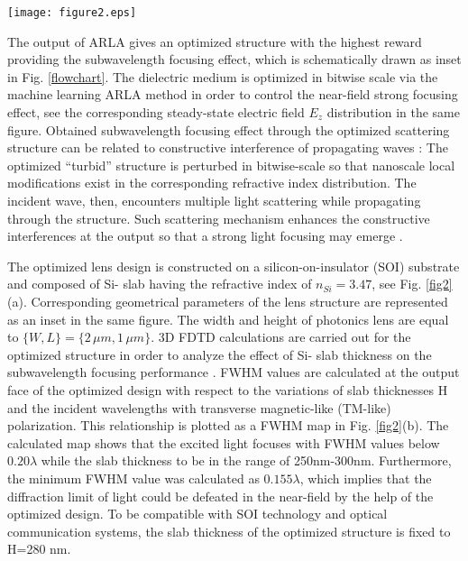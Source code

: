 \documentclass[9pt,twocolumn,twoside]{article}
\begin{document}
  \begin{figure*}[!th]
    \centering
    \texttt{[image: figure2.eps]}
    \caption{(a) Optimized bitwise photonic structure design as a near field sub-wavelength lens. (b) FWHM map depending on the slab thickness and incident wavelength variations. (c) The cross-sections of field intensities are taken at the output and plotted as a map depending on the incident wavelengths.}
    \label{fig2}
  \end{figure*}
  
  The output of ARLA gives an optimized structure with the highest reward providing the subwavelength focusing effect, which is schematically drawn as inset in Fig. \ref{flowchart}. The dielectric medium is optimized in bitwise scale via the machine learning ARLA method in order to control the near-field strong focusing effect, see the corresponding steady-state electric field $E_z$ distribution in the same figure. Obtained subwavelength focusing effect through the optimized scattering structure can be related to constructive interference of propagating waves \cite{Wiersma2013}: The optimized “turbid” structure is perturbed in bitwise-scale so that nanoscale local modifications exist in the corresponding refractive index distribution. The incident wave, then, encounters multiple light scattering while propagating through the structure. Such scattering mechanism enhances the constructive interferences at the output so that a strong light focusing may emerge \cite{Mosk2012}.
  
  The optimized lens design is constructed on a silicon-on-insulator (SOI) substrate and composed of Si- slab having the refractive index of $n_{Si}=3.47$, see Fig. \ref{fig2}(a). Corresponding geometrical parameters of the lens structure are represented as an inset in the same figure. The width and height of photonics lens are equal to $\{W,L\}=\{2\,\mu m,1\,\mu m\}$. 3D FDTD calculations are carried out for the optimized structure in order to analyze the effect of Si- slab thickness on the subwavelength focusing performance \cite{lumerica}. FWHM values are calculated at the output face of the optimized design with respect to the variations of slab thicknesses H and the incident wavelengths with transverse magnetic-like (TM-like) polarization. This relationship is plotted as a FWHM map in Fig. \ref{fig2}(b). The calculated map shows that the excited light focuses with FWHM values below $0.20\lambda$ while the slab thickness to be in the range of 250nm-300nm. Furthermore, the minimum FWHM value was calculated as $0.155\lambda$, which implies that the diffraction limit of light could be defeated in the near-field by the help of the optimized design. To be compatible with SOI technology and optical communication systems, the slab thickness of the optimized structure is fixed to H=280 nm. 
  
\end{document}
